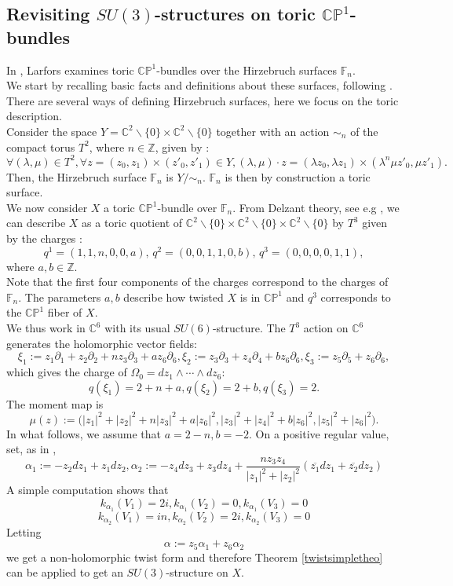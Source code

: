 \documentclass[12pt, reqno]{amsart}
\newcommand{\C}{\mathbb{C}}
\newcommand{\p}{\mathbb{P}}
\newcommand{\Z}{\mathbb{Z}}
\newcommand{\F}{\mathbb{F}}
\begin{document}
\subsection{Revisiting $SU(3)$-structures on toric $\C\p^1$-bundles}
    In \cite{Larfors_2010}, Larfors examines toric $\C\p^1$-bundles over the Hirzebruch surfaces $\F_n$. \\ \indent We start by recalling basic facts and definitions about these surfaces, following \cite{hirzebruchgauduchon}. There are several ways of defining Hirzebruch surfaces, here we focus on the toric description. 
    \\\indent Consider the space $Y=\C^2\backslash\{0\}\times\C^2\backslash\{0\}$ together with an action $\sim_n$ of the compact torus $T^2$, where $n\in\Z$, given by :
    \[\forall (\lambda,\mu)\in T^2,\forall z=(z_0,z_1)\times(z'_0,z'_1)\in Y, (\lambda,\mu)\cdot z=(\lambda z_0, \lambda z_1)\times(\lambda^n\mu z'_0,\mu z'_1).\]
 Then, the Hirzebruch surface $\F_n$ is $Y/\sim_n$. $\F_n$ is then by construction  a toric surface. \\ \indent We now consider $X$ a toric $\C\p^1$-bundle over $\F_n$. From Delzant theory, see e.g \cite{calderbank2003guilleminformulakaehlermetrics}, we can describe $X$ as a toric quotient of $\C^2\backslash\{0\}\times\C^2\backslash\{0\}\times \C^2\backslash\{0\}$ by $T^3$ given by the charges :
 \[q^1=(1,1,n,0,0,a), \, q^2=(0,0,1,1,0,b),\, q^3=(0,0,0,0,1,1),\] 
where $a,b\in\Z$. \\ \indent Note that the first four components of the charges correspond to the charges of $\F_n$. The parameters $a,b$ describe how twisted $X$ is in $\C\p^1$ and $q^3$ corresponds to the $\C\p^1$ fiber of $X$. \\ \indent We thus work in $\C^6$ with its usual $SU(6)$-structure. The $T^3$ action on $\C^6$ generates the holomorphic vector fields:
\[\xi_1:=z_1\partial_1+z_2\partial_2+nz_3\partial_3+az_6\partial_6, \xi_2:=z_3\partial_3+z_4\partial_4+bz_6\partial_6, \xi_3:=z_5\partial_5+z_6\partial_6,\] which gives the charge of $\Omega_0=dz_1\wedge\cdots\wedge dz_6$: \[q(\xi_1)=2+n+a,q(\xi_2)=2+b, q(\xi_3)=2.\] The moment map is \[\mu(z):=\bigg(|z_1|^2+|z_2|^2+n|z_3|^2+a|z_6|^2,|z_3|^2+|z_4|^2+b|z_6|^2,|z_5|^2+|z_6|^2\bigg).\]
\indent In what follows, we assume that $a=2-n,b=-2$. On a positive regular value, set, as in \cite{Larfors_2010}, \[\alpha_1:=-z_2dz_1+z_1dz_2, \alpha_2:=-z_4dz_3+z_3dz_4+\frac{nz_3z_4}{|z_1|^2+|z_2|^2}(\overline{z_1}dz_1+\overline{z_2}dz_2)\]
\indent A simple computation shows that \[k_{\alpha_1}(V_1)=2i, k_{\alpha_1}(V_2)=0, k_{\alpha_1}(V_3)=0\] \[k_{\alpha_2}(V_1)=in, k_{\alpha_2}(V_2)=2i, k_{\alpha_2}(V_3)=0\]\indent Letting \[\alpha:=z_5\alpha_1+z_6\alpha_2\] we get a non-holomorphic twist form and therefore Theorem \ref{twistsimpletheo} can be applied to get an $SU(3)$-structure on $X$.
\end{document}
